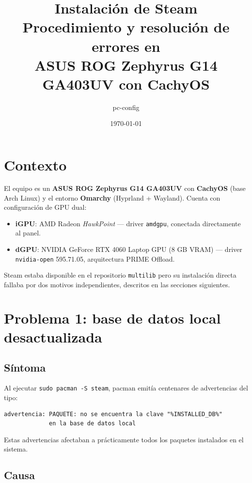 \documentclass[12pt,a4paper]{article}
\title{%
  \textbf{Instalación de Steam}\\[0.4em]
  \large Procedimiento y resolución de errores en\\
  ASUS ROG Zephyrus G14 GA403UV con CachyOS
}
\author{pc-config}
\date{\today}
\begin{document}
\maketitle
\tableofcontents
\newpage

\section{Contexto}

El equipo es un \textbf{ASUS ROG Zephyrus G14 GA403UV} con \textbf{CachyOS}
(base Arch Linux) y el entorno \textbf{Omarchy} (Hyprland + Wayland).
Cuenta con configuración de GPU dual:

\begin{itemize}
  \item \textbf{iGPU}: AMD Radeon \emph{HawkPoint} --- driver \texttt{amdgpu},
        conectada directamente al panel.
  \item \textbf{dGPU}: NVIDIA GeForce RTX 4060 Laptop GPU (8 GB VRAM) ---
        driver \texttt{nvidia-open} 595.71.05, arquitectura PRIME Offload.
\end{itemize}

Steam estaba disponible en el repositorio \texttt{multilib} pero su instalación
directa fallaba por dos motivos independientes, descritos en las secciones
siguientes.

\section{Problema 1: base de datos local desactualizada}

\subsection{Síntoma}

Al ejecutar \lstinline[style=bash]{sudo pacman -S steam}, pacman emitía
centenares de advertencias del tipo:

\begin{lstlisting}[style=bash]
advertencia: PAQUETE: no se encuentra la clave "%INSTALLED_DB%"
             en la base de datos local
\end{lstlisting}

Estas advertencias afectaban a prácticamente todos los paquetes instalados en
el sistema.

\subsection{Causa}
\end{document}
